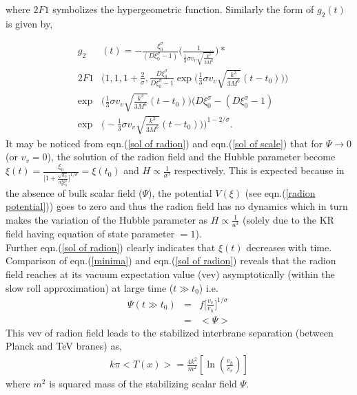 \documentclass[a4paper]{article}
\begin{document}
where $2F1$ symbolizes the hypergeometric function. Similarly the form of $g_2(t)$ is given by,

\begin{eqnarray}
 &g_2&(t)= - \frac{\xi_0^{\sigma}}{(D\xi_0^{\sigma}-1)} \bigg(\frac{1}{\frac{1}{3}\sigma v_v\sqrt{\frac{k^3}{3M^6}}}\bigg)*\nonumber\\ 
 &2F1&\bigg(1,1,1+\frac{2}{\sigma},\frac{D\xi_0^{\sigma}}{D\xi_0^{\sigma}-1}
 \exp{\big(\frac{1}{3}\sigma v_v\sqrt{\frac{k^3}{3M^6}}(t-t_0)\big)}\bigg)\nonumber\\
 &\exp&{\bigg(\frac{1}{3}\sigma v_v\sqrt{\frac{k^3}{3M^6}}(t-t_0)\bigg)} \bigg(D\xi_0^{\sigma}-(D\xi_0^{\sigma}-1)\nonumber\\
 &\exp&{\big(-\frac{1}{3}\sigma v_v\sqrt{\frac{k^3}{3M^6}}(t-t_0)\big)}\bigg)^{1-2/\sigma}.
 \label{g2}
\end{eqnarray}
It may be noticed from eqn.(\ref{sol of radion}) and eqn.(\ref{sol of scale}) that for $\Psi \rightarrow 0$ (or $v_v=0$), the solution of the radion field 
and the Hubble parameter become $\xi(t) = \frac{\xi_0}{\big[1 + \frac{\sqrt{h_0}}{a_0^3\xi_0^2}\big]^{1/\sigma}}=\xi(t_0)$ and $H \propto \frac{1}{a^3}$ 
respectively. This is expected because in the absence of bulk scalar field ($\Psi$), the potential $V(\xi)$ (see eqn.(\ref{radion potential})) 
goes to zero and thus the radion field has no dynamics which in turn makes the variation of the Hubble parameter as $H \propto \frac{1}{a^3}$ 
(solely due to the KR field having equation of state parameter $=1$).\\
Further eqn.(\ref{sol of radion}) clearly indicates that 
$\xi(t)$ decreases with time. Comparison of eqn.(\ref{minima}) and eqn.(\ref{sol of radion}) reveals that the radion 
field reaches at its vacuum expectation value (vev) asymptotically (within the slow roll approximation) at large time ($t\gg t_0$) i.e. 
\begin{eqnarray}
 \Psi(t\gg t_0)&=&f\bigg[\frac{v_v}{v_h}\bigg]^{1/\sigma}\nonumber\\
 &=&<\Psi>
\end{eqnarray}
This vev of radion field leads to the stabilized interbrane separation (between Planck and TeV branes) as,
\begin{eqnarray}
k\pi <T(x)> = \frac{4k^2}{m^2}[\ln{(\frac{v_h}{v_v})}]
 \label{brane separation}
\end{eqnarray}
where $m^2$ is squared mass of the stabilizing scalar field $\Psi$. \\
\end{document}
